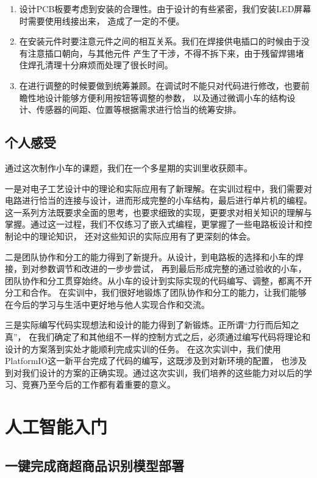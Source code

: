 \documentclass[a4paper,twoside,zihao=5,UTF8]{ctexart}
\begin{document}
\begin{spacing}{1.2}
\begin{enumerate}
	\item 设计PCB板要考虑到安装的合理性。由于设计的有些紧密，我们安装LED屏幕时需要使用线接出来，
	造成了一定的不便。

	\item 在安装元件时要注意元件之间的相互关系。我们在焊接供电插口的时候由于没有注意插口朝向，与其他元件
	产生了干涉，不得不拆下来，由于残留焊锡堵住焊孔清理十分麻烦而处理了很长时间。

	\item 在进行调整的时候要做到统筹兼顾。在调试时不能只对代码进行修改，也要前瞻性地设计能够方便利用按钮等调整的参数，
	以及通过微调小车的结构设计、传感器的间距、位置等根据需求进行恰当的统筹安排。
\end{enumerate}

\subsection{个人感受}

通过这次制作小车的课题，我们在一个多星期的实训里收获颇丰。

一是对电子工艺设计中的理论和实际应用有了新理解。在实训过程中，我们需要对电路进行恰当的连接与设计，进而形成完整的小车结构，最后进行单片机的编程。
这一系列方法既要求全面的思考，也要求细致的实现，更要求对相关知识的理解与掌握。通过这一过程，我们不仅练习了嵌入式编程，更掌握了一些电路板设计和控制论中的理论知识，
还对这些知识的实际应用有了更深刻的体会。

二是团队协作和分工的能力得到了新提升。从设计，到电路板的选择和小车的焊接，到对参数调节和改进的一步步尝试，
再到最后形成完整的通过验收的小车，团队协作和分工贯穿始终。从小车的设计到实际实现的代码编写、调整，都离不开分工和合作。
在实训中，我们很好地锻炼了团队协作和分工的能力，让我们能够在今后的学习与生活中更好地与他人实现合作和交流。

三是实际编写代码实现想法和设计的能力得到了新锻炼。正所谓“力行而后知之真”，
在我们确定了和其他组不一样的控制方式之后，必须通过编写代码将理论和设计的方案落到实处才能顺利完成实训的任务。
在这次实训中，我们使用PlatformIO这一新平台完成了代码的编写，这既涉及到对新环境的配置，
也涉及到对我们设计的方案的正确实现。通过这次实训，我们培养的这些能力对以后的学习、竞赛乃至今后的工作都有着重要的意义。


\clearpage
\section{人工智能入门}

\subsection{一键完成商超商品识别模型部署}


\end{spacing}
\end{document}
